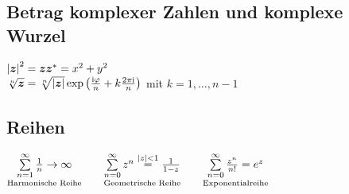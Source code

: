\documentclass[german,color,5pt]{latex4ei/latex4ei_fs}
\begin{document}
\begin{sectionbox}
	\subsection{Betrag komplexer Zahlen und komplexe Wurzel}
	$\left\vert\boldsymbol{z}\right\vert^2 = \boldsymbol{z} \boldsymbol z^* = x^2+y^2$ \\
	 $\sqrt[n]{\boldsymbol{z}}=\sqrt[n]{|\boldsymbol{z}|} \exp \left( \frac{\mathrm{i} \varphi}{n} + k\frac{2\pi\mathrm{i}}{n}\right)$ mit $k=1,\dots,n-1$
\end{sectionbox}

\begin{sectionbox}
	\subsection{Reihen}
	$\underset{\text{Harmonische Reihe}}{\sum\limits_{n=1}^\infty \frac{1}{n} \rightarrow \infty} \qquad   \underset{\text{Geometrische Reihe}}{\sum\limits_{n=0}^\infty z^n \stackrel{|z|<1}= \frac{1}{1-z}}  \qquad \underset{\text{Exponentialreihe}}{\sum\limits_{n = 0}^{\infty} \frac{z^n}{n!} = e^z}$
\end{sectionbox}

%	
	

\end{document}
